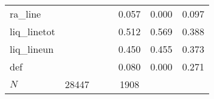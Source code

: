 \begin{table}[htbp]
\begin{tabular}{l*{2}{ccc}}
ra\_line     &            &            &            &       0.057&       0.000&       0.097\\
liq\_linetot &            &            &            &       0.512&       0.569&       0.388\\
liq\_lineun  &            &            &            &       0.450&       0.455&       0.373\\
def         &            &            &            &       0.080&       0.000&       0.271\\
\midrule
\(N\)       &       28447&            &            &        1908&            &            \\
\bottomrule
\end{tabular}
\end{table}
